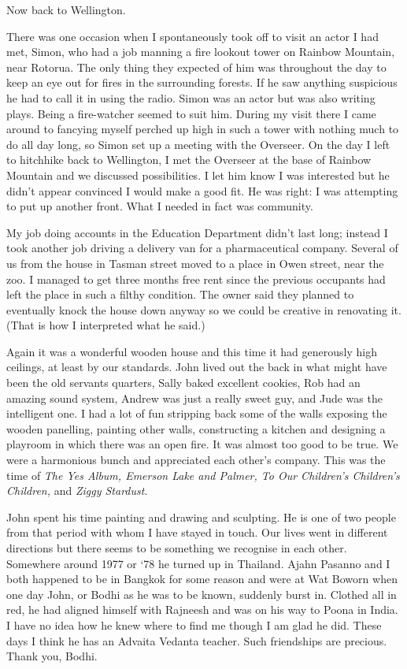 Now back to Wellington.

There was one occasion when I spontaneously took off to visit an actor I
had met, Simon, who had a job manning a fire lookout tower on
Rainbow Mountain\cite{rainbow}, near Rotorua. The only thing they expected of him
was throughout the day to keep an eye out for fires in the surrounding
forests. If he saw anything suspicious he had to call it in using the
radio. Simon was an actor but was also writing plays. Being a
fire-watcher seemed to suit him. During my visit there I came around to
fancying myself perched up high in such a tower with nothing much to do
all day long, so Simon set up a meeting with the Overseer. On the day I
left to hitchhike back to Wellington, I met the Overseer at the base of
Rainbow Mountain and we discussed possibilities. I let him know I was
interested but he didn't appear convinced I would make a good fit. He
was right: I was attempting to put up another front. What I needed in
fact was community.

My job doing accounts in the Education Department didn't last long;
instead I took another job driving a delivery van for a pharmaceutical
company. Several of us from the house in Tasman street moved to a place
in Owen street, near the zoo. I managed to get three months free rent
since the previous occupants had left the place in such a filthy
condition. The owner said they planned to eventually knock the house
down anyway so we could be creative in renovating it. (That is how I
interpreted what he said.)

Again it was a wonderful wooden house and this time it had generously
high ceilings, at least by our standards. John lived out the back in
what might have been the old servants quarters, Sally baked excellent
cookies, Rob had an amazing sound system, Andrew was just a really sweet
guy, and Jude was the intelligent one. I had a lot of fun stripping back
some of the walls exposing the wooden panelling, painting other walls,
constructing a kitchen and designing a playroom in which there was an
open fire. It was almost too good to be true. We were a harmonious bunch
and appreciated each other's company. This was the time of \emph{The Yes
Album, Emerson Lake and Palmer, To Our Children's Children's Children,}
and \emph{Ziggy Stardust}.

John spent his time painting and drawing and sculpting. He is one of two
people from that period with whom I have stayed in touch. Our lives went
in different directions but there seems to be something we recognise in
each other. Somewhere around 1977 or `78 he turned up in Thailand. Ajahn
Pasanno and I both happened to be in Bangkok for some reason and were at
Wat Boworn when one day John, or Bodhi as he was to be known, suddenly
burst in. Clothed all in red, he had aligned himself with Rajneesh and
was on his way to Poona in India. I have no idea how he knew where to
find me though I am glad he did. These days I think he has an Advaita
Vedanta teacher. Such friendships are precious. Thank you, Bodhi.

